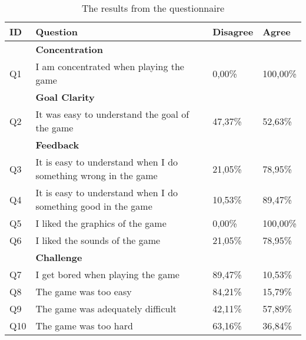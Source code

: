 \begin{table}[]
	\centering
	\caption{The results from the questionnaire}
	\label{tab:simple_results}
	\begin{tabularx}{\textwidth}{|l|X|l|l|}
		\hline
		\textbf{ID} & \textbf{Question}                                              & \textbf{Disagree} & \textbf{Agree} \\ \hline
		& \textbf{Concentration}                                         &                   &                \\ \hline
		Q1          & I am concentrated when playing the game                        & 0,00\%            & 100,00\%       \\ \hline
		& \textbf{Goal Clarity}                                          &                   &                \\ \hline
		Q2          & It was easy to understand the goal of the game                 & 47,37\%           & 52,63\%        \\ \hline
		& \textbf{Feedback}                                              &                   &                \\ \hline
		Q3          & It is easy to understand when I do something wrong in the game & 21,05\%           & 78,95\%        \\ \hline
		Q4          & It is easy to understand when I do something good in the game  & 10,53\%           & 89,47\%        \\ \hline
		Q5          & I liked the graphics of the game                               & 0,00\%            & 100,00\%       \\ \hline
		Q6          & I liked the sounds of the game                                 & 21,05\%           & 78,95\%        \\ \hline
		& \textbf{Challenge}                                             &                   &                \\ \hline
		Q7          & I get bored when playing the game                              & 89,47\%           & 10,53\%        \\ \hline
		Q8          & The game was too easy                                          & 84,21\%           & 15,79\%        \\ \hline
		Q9          & The game was adequately difficult                              & 42,11\%           & 57,89\%        \\ \hline
		Q10         & The game was too hard                                          & 63,16\%           & 36,84\%        \\ \hline

\end{tabularx}
\end{table}
